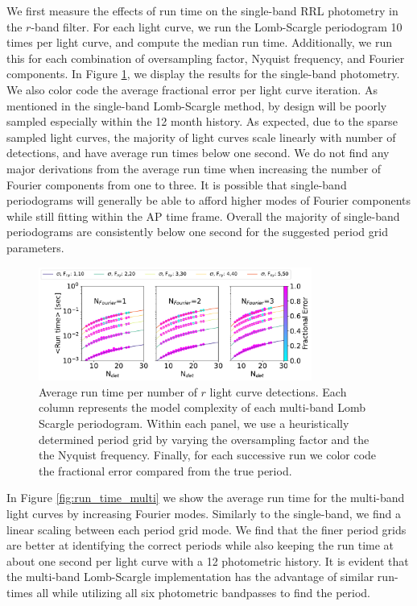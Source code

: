 \documentclass[DM,authoryear,toc]{lsstdoc}
\begin{document}
We first measure the effects of run time on the single-band RRL photometry in the $r$-band filter.
For each light curve, we run the Lomb-Scargle periodogram 10 times per light curve, and compute the median run time.
Additionally, we run this for each combination of oversampling factor, Nyquist frequency, and Fourier components.
In Figure \ref{fig:run_time_single}, we display the results for the single-band photometry.
We also color code the average fractional error per light curve iteration.
As mentioned in the single-band Lomb-Scargle method, by design will be poorly sampled especially within the 12 month history.
As expected, due to the sparse sampled light curves, the majority of light curves scale linearly with number of detections, and have average run times below one second.
We do not find any major derivations from the average run time when increasing the number of Fourier components from one to three.
It is possible that single-band periodograms will generally be able to afford higher modes of Fourier components while still fitting within the AP time frame.
Overall the majority of single-band periodograms are consistently below one second for the suggested period grid parameters.


 
 \begin{figure}
  \includegraphics[width=0.8\textwidth]{figures/singleRUN_LSP_RRL.pdf}
  \centering 
  \caption{Average run time per number of $r$ light curve detections.
Each column represents the model complexity of each multi-band Lomb Scargle periodogram.
Within each panel, we use a heuristically determined period grid by varying the oversampling factor and the the Nyquist frequency.
 Finally, for each successive run we color code the fractional error compared from the true period.}
  \label{fig:run_time_single}
\end{figure}

In Figure \ref{fig:run_time_multi} we show the average run time for the multi-band light curves by increasing Fourier modes.
Similarly to the single-band, we find a linear scaling between each period grid mode.
We find that the finer period grids are better at identifying the correct periods while also keeping the run time at about one second per light curve with a 12 photometric history.
It is evident that the multi-band Lomb-Scargle implementation has the advantage of similar run-times all while utilizing all six photometric bandpasses to find the period.
\end{document}
